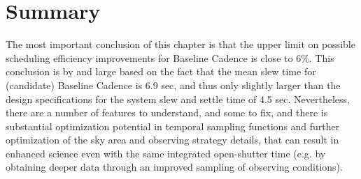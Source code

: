 

%
%
%
%
%
%
%
%
%
%
%

\section{Summary}
\def\secname{cadexp:summary}\label{sec:\secname}

The most important conclusion of this chapter is that the upper limit on
possible scheduling efficiency improvements for Baseline Cadence is
close to 6\%. This conclusion is by and large based on the fact that
the mean slew time for (candidate) Baseline Cadence is 6.9 sec, and
thus only slightly larger than the design specifications for the
system slew and settle time of 4.5 sec.  Nevertheless, there are a
number of features to understand, and some to fix, and there is
substantial optimization potential in temporal sampling functions and
further optimization of the sky area and observing strategy details,
that can result in enhanced science even with the same integrated
open-shutter time (e.g. by obtaining deeper data through an improved
sampling of observing conditions).

